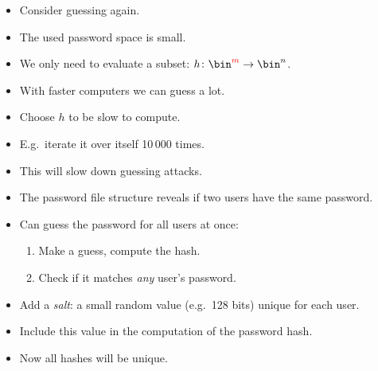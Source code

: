 \begin{frame}
  \begin{remark}
    \begin{itemize}
      \item Consider guessing again.
      \item The used password space is small.
      \item We only need to evaluate a subset: \(h\colon 
          \bin^{\color{red}{m}}\to \bin^n\).
      \item With faster computers we can guess a lot.
    \end{itemize}
  \end{remark}

  \pause{}

  \begin{solution}
    \begin{itemize}
      \item Choose \(h\) to be slow to compute.
      \item E.g.\ iterate it over itself 10\,000 times.
      \item This will slow down guessing attacks.
    \end{itemize}
  \end{solution}
\end{frame}

\begin{frame}
  \begin{remark}
    \begin{itemize}
      \item The password file structure reveals if two users have the same 
        password.
      \item Can guess the password for all users at once:
        \begin{enumerate}
          \item Make a guess, compute the hash.
          \item Check if it matches \emph{any} user's password.
        \end{enumerate}
    \end{itemize}
  \end{remark}

  \pause{}

  \begin{solution}
    \begin{itemize}
      \item Add a \emph{salt}: a small random value (e.g.\ 128 bits) unique for 
        each user.
      \item Include this value in the computation of the password hash.
      \item Now all hashes will be unique.
    \end{itemize}
  \end{solution}
\end{frame}

